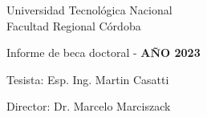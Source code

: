 \thispagestyle{empty}

\begin{center}
	\vspace*{3cm}
	
	
	\vspace{2cm}
	
	\LARGE{Universidad Tecnológica Nacional\\
		Facultad Regional Córdoba}
	
	\vspace{2cm}
	
	\LARGE{Informe de beca doctoral - \textbf{AÑO 2023}}
	
	\vspace{2cm}
\end{center}

\begin{flushright} 
	\Large{Tesista: Esp. Ing. Martin Casatti}

	\vspace{0.3cm}
	\Large{Director: Dr. Marcelo Marciszack}
	
\end{flushright} 
